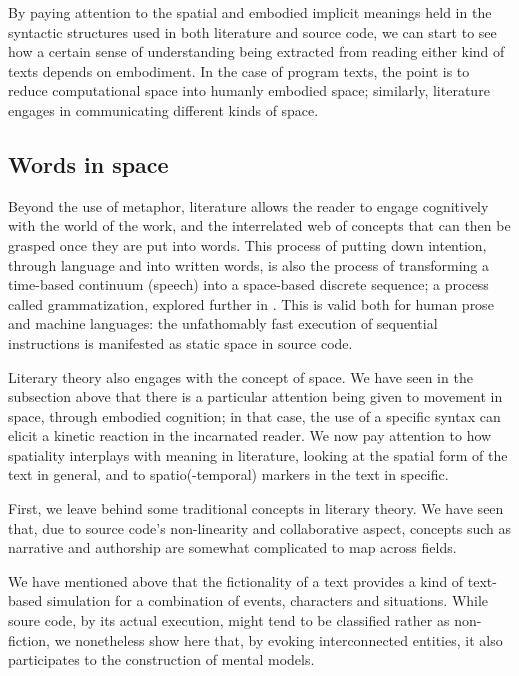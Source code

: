 By paying attention to the spatial and embodied implicit meanings held in the syntactic structures used in both literature and source code, we can start to see how a certain sense of understanding being extracted from reading either kind of texts depends on embodiment. In the case of program texts, the point is to reduce computational space into humanly embodied space; similarly, literature engages in communicating different kinds of space.

\subsection{Words in space}
\label{subsec:spatial-literature}

Beyond the use of metaphor, literature allows the reader to engage cognitively with the world of the work, and the interrelated web of concepts that can then be grasped once they are put into words. This process of putting down intention, through language and into written words, is also the process of transforming a time-based continuum (speech) into a space-based discrete sequence; a process called grammatization, explored further in \citep{bouchardon_valeur_2014}. This is valid both for human prose and machine languages: the unfathomably fast execution of sequential instructions is manifested as static space in source code.

Literary theory also engages with the concept of space. We have seen in the subsection above that there is a particular attention being given to movement in space, through embodied cognition; in that case, the use of a specific syntax can elicit a kinetic reaction in the incarnated reader. We now pay attention to how spatiality interplays with meaning in literature, looking at the spatial form of the text in general, and to spatio(-temporal) markers in the text in specific.

First, we leave behind some traditional concepts in literary theory. We have seen that, due to source code's non-linearity and collaborative aspect, concepts such as narrative and authorship are somewhat complicated to map across fields.

We have mentioned above that the fictionality of a text provides a kind of text-based simulation for a combination of events, characters and situations. While soure code, by its actual execution, might tend to be classified rather as non-fiction, we nonetheless show here that, by evoking interconnected entities, it also participates to the construction of mental models.

